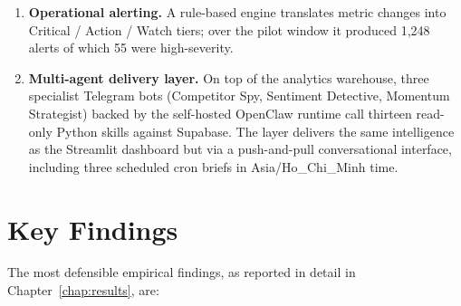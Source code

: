 \begin{enumerate}
  \item \textbf{Operational alerting.} A rule-based engine translates
  metric changes into Critical / Action / Watch tiers; over the pilot
  window it produced 1{,}248 alerts of which 55 were high-severity.

  \item \textbf{Multi-agent delivery layer.} On top of the analytics
  warehouse, three specialist Telegram bots (Competitor Spy, Sentiment
  Detective, Momentum Strategist) backed by the self-hosted OpenClaw
  runtime call thirteen read-only Python skills against Supabase. The
  layer delivers the same intelligence as the Streamlit dashboard but
  via a push-and-pull conversational interface, including three
  scheduled cron briefs in Asia/Ho\_Chi\_Minh time.
\end{enumerate}

\section{Key Findings}

The most defensible empirical findings, as reported in detail in
Chapter~\ref{chap:results}, are:

